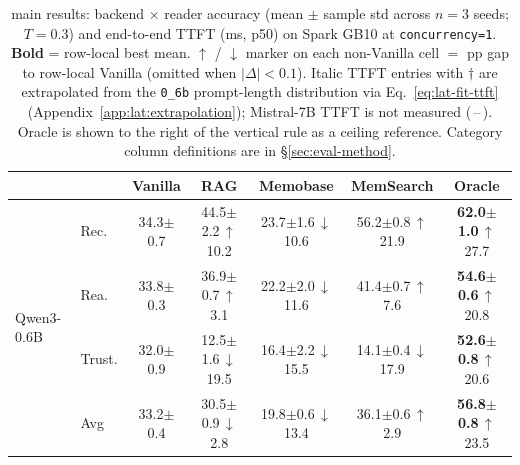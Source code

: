 \begin{table}[t]
\centering
\caption{\benchL{} main results: backend $\times$ reader accuracy (mean $\pm$ sample std across $n=3$ seeds; $T{=}0.3$) and end-to-end TTFT (ms, p50) on Spark GB10 at \texttt{concurrency=1}. \textbf{Bold} = row-local best mean. {\tiny\textcolor{green!55!black}{$\uparrow$}} / {\tiny\textcolor{red!70!black}{$\downarrow$}} marker on each non-Vanilla cell $=$ pp gap to row-local Vanilla (omitted when $|\Delta| < 0.1$). Italic TTFT entries with $\dagger$ are extrapolated from the \texttt{0\_6b} prompt-length distribution via Eq.~\ref{eq:lat-fit-ttft} (Appendix~\ref{app:lat:extrapolation}); Mistral-7B TTFT is not measured ($\,$--$\,$). Oracle is shown to the right of the vertical rule as a ceiling reference. Category column definitions are in \S\ref{sec:eval-method}.}
\label{tab:results-L}
\footnotesize
\setlength{\tabcolsep}{4pt}
\renewcommand{\arraystretch}{1.15}
\begin{tabular}{@{}ll c c c c | c @{}}
\toprule
 & & \textbf{Vanilla} & \textbf{RAG} & \textbf{Memobase} & \textbf{MemSearch} & \textbf{Oracle} \\
\midrule
\multirow{5}{*}{Qwen3-0.6B} & Rec. & 34.3{\scriptsize$\pm$0.7} & 44.5{\scriptsize$\pm$2.2}\,{\tiny\textcolor{green!55!black}{$\uparrow$10.2}} & 23.7{\scriptsize$\pm$1.6}\,{\tiny\textcolor{red!70!black}{$\downarrow$10.6}} & 56.2{\scriptsize$\pm$0.8}\,{\tiny\textcolor{green!55!black}{$\uparrow$21.9}} & \textbf{62.0{\scriptsize$\pm$1.0}}\,{\tiny\textcolor{green!55!black}{$\uparrow$27.7}} \\
 & Rea. & 33.8{\scriptsize$\pm$0.3} & 36.9{\scriptsize$\pm$0.7}\,{\tiny\textcolor{green!55!black}{$\uparrow$3.1}} & 22.2{\scriptsize$\pm$2.0}\,{\tiny\textcolor{red!70!black}{$\downarrow$11.6}} & 41.4{\scriptsize$\pm$0.7}\,{\tiny\textcolor{green!55!black}{$\uparrow$7.6}} & \textbf{54.6{\scriptsize$\pm$0.6}}\,{\tiny\textcolor{green!55!black}{$\uparrow$20.8}} \\
 & Trust. & 32.0{\scriptsize$\pm$0.9} & 12.5{\scriptsize$\pm$1.6}\,{\tiny\textcolor{red!70!black}{$\downarrow$19.5}} & 16.4{\scriptsize$\pm$2.2}\,{\tiny\textcolor{red!70!black}{$\downarrow$15.5}} & 14.1{\scriptsize$\pm$0.4}\,{\tiny\textcolor{red!70!black}{$\downarrow$17.9}} & \textbf{52.6{\scriptsize$\pm$0.8}}\,{\tiny\textcolor{green!55!black}{$\uparrow$20.6}} \\
 & Avg & 33.2{\scriptsize$\pm$0.4} & 30.5{\scriptsize$\pm$0.9}\,{\tiny\textcolor{red!70!black}{$\downarrow$2.8}} & 19.8{\scriptsize$\pm$0.6}\,{\tiny\textcolor{red!70!black}{$\downarrow$13.4}} & 36.1{\scriptsize$\pm$0.6}\,{\tiny\textcolor{green!55!black}{$\uparrow$2.9}} & \textbf{56.8{\scriptsize$\pm$0.8}}\,{\tiny\textcolor{green!55!black}{$\uparrow$23.5}} \\

\end{tabular}
\end{table}
